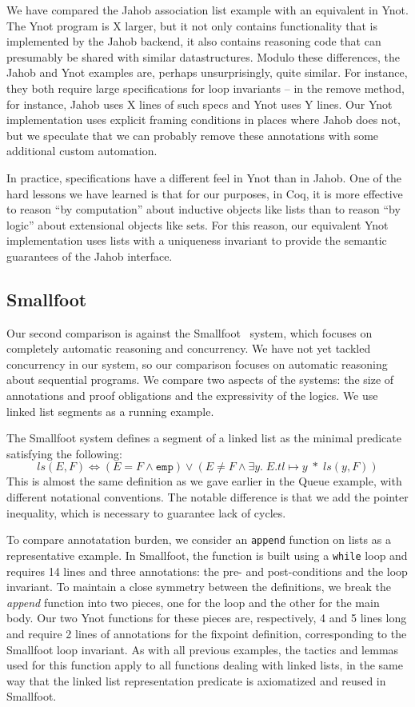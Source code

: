 \documentclass[preprint,nocopyrightspace]{sigplanconf}
\begin{document}
{We have compared the Jahob association list example with an equivalent
in Ynot.  The Ynot program is X larger, but it not only contains
functionality that is implemented by the Jahob backend, it also
contains reasoning code that can presumably be shared with similar
datastructures.  Modulo these differences, the Jahob and Ynot examples
are, perhaps unsurprisingly, quite similar.  For instance, they both
require large specifications for loop invariants -- in the remove
method, for instance, Jahob uses X lines of such specs and Ynot uses Y
lines.  Our Ynot implementation uses explicit framing conditions in
places where Jahob does not, but we speculate that we can probably
remove these annotations with some additional custom automation.

In practice, specifications have a different feel in Ynot than in Jahob.  One of
the hard lessons we have learned is that for our purposes, in Coq, 
it is more effective to reason ``by computation'' about inductive objects like lists
than to reason ``by logic'' about extensional objects like sets.  For this reason,
our equivalent Ynot implementation
uses lists with a uniqueness invariant to provide the semantic guarantees
of the Jahob interface.

\subsection{Smallfoot}

Our second comparison is against the Smallfoot~\cite{smallfoot}
system, which focuses on completely automatic reasoning and
concurrency.  We have not yet tackled concurrency in our system, so
our comparison focuses on automatic reasoning about sequential
programs.  We compare two aspects of the systems: the size of
annotations and proof obligations and the expressivity of the
logics. We use linked list segments as a running example.

The Smallfoot system defines a segment of a linked list as the minimal
predicate satisfying the following:
$$
ls(E,F) \Leftrightarrow (E = F \wedge \mathtt{emp}) \vee (E \neq F \wedge \exists y. \; E.tl \mapsto y \; * \; ls(y,F))
$$
This is almost the same definition as we gave earlier in the Queue example, with different notational conventions.  The notable difference is that we add the pointer inequality, which is necessary to guarantee lack of cycles.

To compare annotatation burden, we consider an {\tt append} function
on lists as a representative example. In Smallfoot, the function is
built using a {\tt while} loop and requires 14 lines and three
annotations: the pre- and post-conditions and the loop invariant. To
maintain a close symmetry between the definitions, we break the {\it
append} function into two pieces, one for the loop and the other for
the main body. Our two Ynot functions for these pieces are,
respectively, 4 and 5 lines long and require 2 lines of annotations
for the fixpoint definition, corresponding to the Smallfoot loop
invariant. As with all previous examples, the tactics and lemmas used
for this function apply to all functions dealing with linked lists, in
the same way that the linked list representation predicate is
axiomatized and reused in Smallfoot.

}
\end{document}
